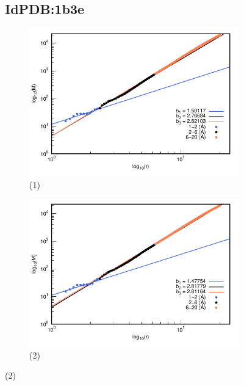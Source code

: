 		\begin{figure}[H]
			\subsection*{IdPDB:1b3e}
			
			\hspace{-0.3cm} 
			\begin{subfigure}{0.49\textwidth}
				\centering
				\includegraphics[width=\linewidth,page=1]{graphs/PDBs/1b3e/1b3eaddH.pdf}
				\caption{(1)}
			\end{subfigure}
			\hspace{0.2cm}
			\begin{subfigure}{0.49\textwidth}
				\centering
				\includegraphics[width=\linewidth,page=1]{graphs/PDBs/1b3e/1b3eEm.pdf}
				\caption{(2)}
			\end{subfigure}
			

\end{figure}
